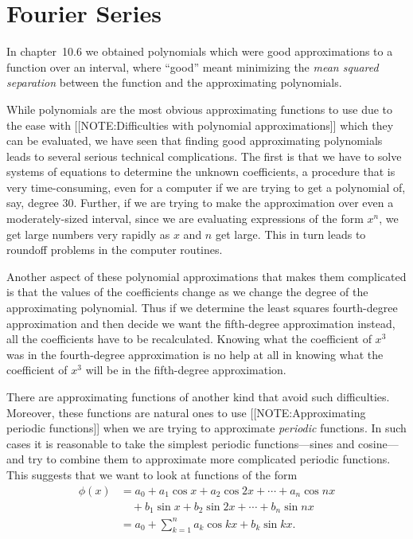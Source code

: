 \section{Fourier Series}
\label{sec:fourier-series}

In chapter~10.6 we obtained polynomials which were good approximations
to a function over an interval, where ``good'' meant minimizing the
{\em mean squared separation} between the function and the
approximating polynomials.

While polynomials are the most obvious approximating functions to use
due to the ease with
[[NOTE:Difficulties with polynomial approximations]]
which they can be evaluated, we have seen that finding good
approximating polynomials leads to several serious technical
complications.  The first is that we have to solve systems of
equations to determine the unknown coefficients, a procedure that is
very time-consuming, even for a computer if we are trying to get a
polynomial of, say, degree 30.  Further, if we are trying to make the
approximation over even a moderately-sized interval, since we are
evaluating expressions of the form $x^n$, we get large numbers very
rapidly as $x$ and $n$ get large.  This in turn leads to roundoff
problems in the computer routines.

Another aspect of these polynomial approximations that makes them
complicated is that the values of the coefficients change as we change
the degree of the approximating polynomial.  Thus if we determine the
least squares fourth-degree approximation and then decide we want the
fifth-degree approximation instead, all the coefficients have to be
recalculated.  Knowing what the coefficient of $x^3$ was in the
fourth-degree approximation is no help at all in knowing what the
coefficient of $x^3$ will be in the fifth-degree approximation.

There are approximating functions of another kind that avoid such
difficulties.  Moreover, these functions are natural ones to use
[[NOTE:Approximating  periodic functions]]
when we are trying to approximate {\em periodic} functions. In such
cases it is reasonable to take the simplest periodic functions---sines
and cosine---and try to combine them to approximate more complicated
periodic functions.  This suggests that we want to look at functions
of the form
\begin{align*}
\phi(x) &= a_0 + a_1 \cos{x}+ a_2\cos{2x} + \cdots+ a_n\cos{nx} \\
 &  \mbox{}\quad +b_1 \sin{x} + b_2 \sin{2x} + \cdots + b_n\sin{nx} \\
 &= a_0 + \sum_{k=1}^n a_k \cos{kx} + b_k \sin{kx}.
\end{align*}

